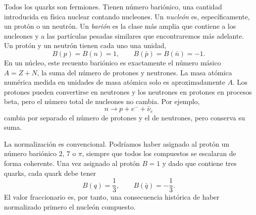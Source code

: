 Todos los quarks son fermiones. Tienen número bariónico, una cantidad introducida en física nuclear contando nucleones. Un \emph{nucleón} es, específicamente, un protón o un neutrón. Un \emph{barión} es la clase más amplia que contiene a los nucleones y a las partículas pesadas similares que encontraremos más adelante. Un protón y un neutrón tienen cada uno una unidad,
\begin{equation}
B(p)=B(n)=1,
\qquad
B(\bar p)=B(\bar n)=-1.
\end{equation}
En un núcleo, este recuento bariónico es exactamente el número másico \(A=Z+N\), la suma del número de protones y neutrones. La masa atómica numérica medida en unidades de masa atómica solo es aproximadamente \(A\). Los protones pueden convertirse en neutrones y los neutrones en protones en procesos beta, pero el número total de nucleones no cambia. Por ejemplo,
\begin{equation}
n\longrightarrow p+e^-+\bar\nu_e
\end{equation}
cambia por separado el número de protones y el de neutrones, pero conserva su suma.

\begin{classroomqa}
\end{classroomqa}

La normalización es convencional. Podríamos haber asignado al protón un número bariónico \(2\), \(7\) o \(\pi\), siempre que todos los compuestos se escalaran de forma coherente. Una vez asignado al protón \(B=1\) y dado que contiene tres quarks, cada quark debe tener
\begin{equation}
B(q)=\frac13,
\qquad
B(\bar q)=-\frac13.
\end{equation}
El valor fraccionario es, por tanto, una consecuencia histórica de haber normalizado primero el nucleón compuesto.

\begin{classroomqa}
\end{classroomqa}

